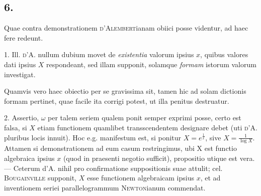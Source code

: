 \documentclass[14pt]{memoir}
\theoremstyle{plain}
\theoremstyle{remark}
\begin{document}
\subsection*{6.}

Quae contra demonstrationem \textsc{d'Alembert}ianam obiici posse videntur, ad haec fere redeunt.

1. Ill. \textsc{d'A}. nullum dubium movet de \textit{existentia} valorum ipsius \(x\), quibus valores dati ipsius \(X\) respondeant, sed illam supponit, solamque \textit{formam} istorum valorum investigat.

Quamvis vero haec obiectio per se gravissima sit, tamen hic ad solam dictionis formam pertinet, quae facile ita corrigi potest, ut illa penitus destruatur.

2. Assertio, \(\omega\) per talem seriem qualem ponit semper exprimi posse, certo est falsa, si \(X\) etiam functionem quamlibet transscendentem designare debet (uti \textsc{d'A.} pluribus locis innuit). Hoc e.g. manifestum est, si ponitur \(X = e^{\frac{1}{x}}\), sive \(X = \frac{1}{\log X}\). Attamen si demonstrationem ad eum casum restringimus, ubi X est functio algebraica ipsius \(x\) (quod in praesenti negotio sufficit), propositio utique est vera. — Ceterum d'A. nihil pro confirmatione suppositionis suae attulit; cel. \textsc{Bougainville} supponit, \(X\) esse functionem algebraicam ipsius \(x\), et ad inventionem seriei parallelogrammum \textsc{Newton}ianum commendat.
\end{document}
